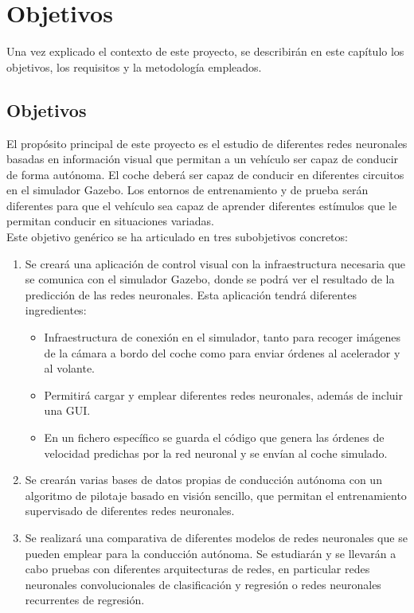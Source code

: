 \chapter{Objetivos}\label{cap.objetivos}

Una vez explicado el contexto de este proyecto, se describirán en este capítulo los objetivos, los requisitos y la metodología empleados.

\section{Objetivos}

El propósito principal de este proyecto es el estudio de diferentes redes neuronales basadas en información visual que permitan a un vehículo ser capaz de conducir de forma autónoma. El coche deberá ser capaz de conducir en diferentes circuitos en el simulador Gazebo. Los entornos de entrenamiento y de prueba serán diferentes para que el vehículo sea capaz de aprender diferentes estímulos que le permitan conducir en situaciones variadas.\\

Este objetivo genérico se ha articulado en tres subobjetivos concretos:

\begin{enumerate}
    \item Se creará una aplicación de control visual con la infraestructura necesaria que se comunica con el simulador Gazebo, donde se podrá ver el resultado de la predicción de las redes neuronales. Esta aplicación tendrá diferentes ingredientes: 

    \begin{itemize}
        \item Infraestructura de conexión en el simulador, tanto para recoger imágenes de la cámara a bordo del coche como para enviar órdenes al acelerador y al volante.
        \item Permitirá cargar y emplear diferentes redes neuronales, además de incluir una GUI.
        \item En un fichero específico se guarda el código que genera las órdenes de velocidad predichas por la red neuronal y se envían al coche simulado.
    \end{itemize}
    
    \item Se crearán varias bases de datos propias de conducción autónoma con un algoritmo de pilotaje basado en visión sencillo, que permitan el entrenamiento supervisado de diferentes redes neuronales.
    
    \item Se realizará una comparativa de diferentes modelos de redes neuronales que se pueden emplear para la conducción autónoma. Se estudiarán y se llevarán a cabo pruebas con diferentes arquitecturas de redes, en particular redes neuronales convolucionales de clasificación y regresión o redes neuronales recurrentes de regresión. 
\end{enumerate}


